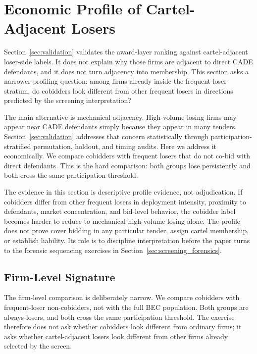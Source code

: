 \section{Economic Profile of Cartel-Adjacent Losers}
\label{sec:cobidder_type}

Section~\ref{sec:validation} validates the award-layer ranking
against cartel-adjacent loser-side labels. It does not explain
why those firms are adjacent to direct CADE defendants, and it
does not turn adjacency into membership. This section asks a
narrower profiling question: among firms already inside the
frequent-loser stratum, do cobidders look different from other
frequent losers in directions predicted by the screening
interpretation?

The main alternative is mechanical adjacency. High-volume losing
firms may appear near CADE defendants simply because they appear
in many tenders. Section~\ref{sec:validation} addresses that
concern statistically through participation-stratified
permutation, holdout, and timing audits. Here we address it
economically. We compare cobidders with frequent losers that do
not co-bid with direct defendants. This is the hard comparison:
both groups lose persistently and both cross the same
participation threshold.

The evidence in this section is descriptive profile evidence,
not adjudication. If cobidders differ from other frequent losers
in deployment intensity, proximity to defendants, market
concentration, and bid-level behavior, the cobidder label
becomes harder to reduce to mechanical high-volume losing alone.
The profile does not prove cover bidding in any particular
tender, assign cartel membership, or establish liability. Its
role is to discipline interpretation before the paper turns to
the forensic sequencing exercises in
Section~\ref{sec:screening_forensics}.

\subsection{Firm-Level Signature}
\label{sec:cobidder_firm}

The firm-level comparison is deliberately narrow. We compare
cobidders with frequent-loser non-cobidders, not with the full
BEC population. Both groups are always-losers, and both cross
the same participation threshold. The exercise therefore does
not ask whether cobidders look different from ordinary firms;
it asks whether cartel-adjacent losers look different from
other firms already selected by the screen.

